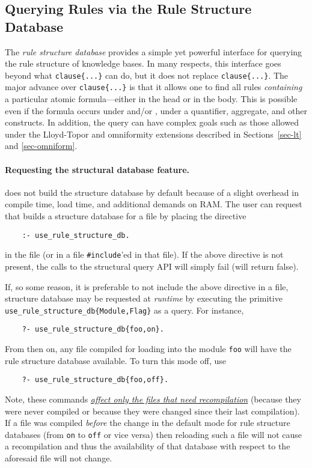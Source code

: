 
\subsection{Querying Rules via the Rule Structure Database}

The \emph{rule structure database} provides a simple yet powerful
interface for querying the rule structure of \ERGO knowledge bases. In many
respects, this interface goes beyond what \texttt{clause\{...\}} can do,
but it does not replace \texttt{clause\{...\}}.
The major advance over \texttt{clause\{...\}} is that it allows one to find
all rules \emph{containing} a particular atomic formula---either in the
head or in the body. This is possible even if the formula occurs under
\texttt{\RULELOGNEG}  and/or \texttt{\RULELOGNAF},  under a quantifier,
aggregate, and other
constructs. In addition, the query can have complex goals such as 
those allowed under the Lloyd-Topor and omniformity extensions described in
Sections~\ref{sec-lt} and \ref{sec-omniform}.


\paragraph{Requesting the structural database feature.}
\ERGO does not build the structure database by default because of a slight
overhead in compile time, load time, and additional demands on RAM.
The user can request that \ERGO builds a structure database for a file by
placing the directive
\begin{verbatim}
    :- use_rule_structure_db.
\end{verbatim}
in the file (or in a file \texttt{\#include}'ed in that file).
If the above directive is not present, the calls to the structural query
API will simply fail (will return false).

If, so some reason, it is preferable to not include
the above directive in a file, structure database may be requested at
\emph{runtime} by executing the primitive
\texttt{use\_rule\_structure\_db\{Module,Flag\}} as a query. For instance,
\begin{verbatim}
    ?- use_rule_structure_db{foo,on}.
\end{verbatim}
From then on, any file compiled for loading into the module \texttt{foo} will
have the rule structure database available. To turn this mode off, use
\begin{verbatim}
    ?- use_rule_structure_db{foo,off}.
\end{verbatim}
Note, these commands \underline{\emph{affect only the files that need
  recompilation}} (because they were never compiled or because they were
changed since their last compilation). If a file was compiled \emph{before}
the change in the default mode for rule structure databases (from
\texttt{on} to \texttt{off} or vice versa) then reloading such a file will
not cause a recompilation and thus the availability of that database with
respect to the aforesaid file will not change.

